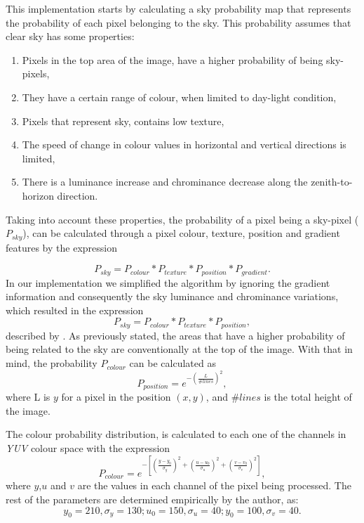 This implementation starts by calculating a sky probability map that represents the probability of each pixel belonging to the sky. This probability assumes that clear sky has some properties:
\begin{enumerate}
	\item Pixels in the top area of the image, have a higher probability of being sky-pixels,
	\item They have a certain range of colour, when limited to day-light condition,
	\item Pixels that represent sky, contains low texture,
	\item The speed of change in colour values in horizontal and vertical directions is limited,
	\item There is a luminance increase and chrominance decrease along the zenith-to-horizon direction.
\end{enumerate}
Taking into account these properties, the probability of a pixel being a sky-pixel ($P_{sky}$), can be calculated through a pixel colour, texture, position and gradient features by the expression

\begin{equation}
	P_{sky} = P_{colour} * P_{texture} * P_{position} * P_{gradient}.
	\label{eq:cd_eq}
\end{equation}
In our implementation we simplified the algorithm by ignoring the gradient information and consequently the sky luminance and chrominance variations, which resulted in the expression
\begin{equation}
	P_{sky} = P_{colour} * P_{texture} * P_{position},
\end{equation}
described by \cite{herman2003adaptive} \cite{herman2003adaptive}. As previously stated, the areas that have a higher probability of being related to the sky are conventionally at the top of the image. With that in mind, the probability $P_{colour}$ can be calculated as
\begin{equation}
	P_{position} = e^{- \left( \frac{L}{\#lines} \right)^2},
	\label{eq:colour_sky}
\end{equation}
where L is $y$ for a pixel in the position $(x,y)$, and $\#lines$ is the total height of the image.

The colour probability distribution, is calculated to each one of the channels in \emph{YUV} colour space with the expression
\begin{equation}
	P_{colour} =  e^{- \left[ \left(\frac{y-y_{0}}{\sigma_{y}} \right)^2 + \left(\frac{u-u_{0}}{\sigma_{u}} \right)^2 + \left(\frac{v-v_{0}}{\sigma_{v}} \right)^2\right]},
\end{equation}
where $y$,$u$ and $v$ are the values in each channel of the pixel being processed. The rest of the parameters are determined empirically by the author, as:
\begin{equation}
	y_{0} = 210, \sigma_{y}=130;
	u_{0} = 150, \sigma_{u}=40;
	y_{0} = 100, \sigma_{v}=40.
\end{equation}


